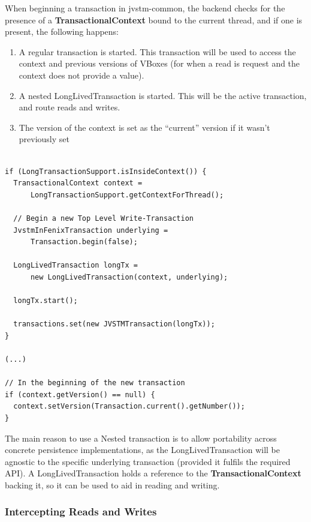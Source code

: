 When beginning a transaction in jvstm-common, the backend checks for
the presence of a {\bf TransactionalContext} bound to the current
thread, and if one is present, the following happens:

\begin{enumerate}

\item A regular transaction is started. This transaction will be used
  to access the context and previous versions of VBoxes (for when a
  read is request and the context does not provide a value).

\item A nested LongLivedTransaction is started. This will be the
  active transaction, and route reads and writes.

\item The version of the context is set as the ``current'' version if
  it wasn't previously set

\end{enumerate}

\begin{lstlisting}[caption={Beginning a new Long Lived Transaction
    step}]

if (LongTransactionSupport.isInsideContext()) {
  TransactionalContext context = 
      LongTransactionSupport.getContextForThread();

  // Begin a new Top Level Write-Transaction
  JvstmInFenixTransaction underlying =
      Transaction.begin(false);

  LongLivedTransaction longTx = 
      new LongLivedTransaction(context, underlying);

  longTx.start();

  transactions.set(new JVSTMTransaction(longTx));
}

(...)

// In the beginning of the new transaction
if (context.getVersion() == null) {
  context.setVersion(Transaction.current().getNumber());
}
\end{lstlisting}

The main reason to use a Nested transaction is to allow portability
across concrete persistence implementations, as the
LongLivedTransaction will be agnostic to the specific underlying
transaction (provided it fulfils the required API). A
LongLivedTransaction holds a reference to the {\bf
  TransactionalContext} backing it, so it can be used to aid in
reading and writing.

\subsubsection{Intercepting Reads and Writes}


